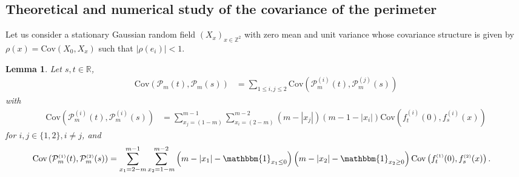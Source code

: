 \documentclass[12pt]{article}
\theoremstyle{Theorem}
\newtheorem{Lemma}[Theorem]{Lemma}
\theoremstyle{definition}
\begin{document}
\subsection{Theoretical and numerical study of the covariance of the perimeter}
Let us consider a stationary Gaussian random field $\left(X_{\scriptscriptstyle x}\right)_{x \in \mathbb{Z}^{2}}$ with zero mean and unit variance whose covariance structure is given by $\rho(x) = \text{Cov}\left(X_{\scriptscriptstyle 0}, X_{\scriptscriptstyle x}\right)$ such that $|\rho(e_i)| < 1$.
\begin{Lemma} 
Let $s, t \in \mathbb{R}$, 
\label{CovLemma}
\begin{align*}
\text{Cov}(\mathcal{P}_{m}(t), \mathcal{P}_{m}(s))  & = \sum_{1\leq i,j\leq 2}\text{Cov}(\mathcal{P}_{m}^{\scriptscriptstyle (i)}(t), \mathcal{P}_{m}^{\scriptscriptstyle (j)}(s)) 
\end{align*} 
with 
\begin{align*}
\text{Cov}\left(\mathcal{P}_{m}^{\scriptscriptstyle (i)}(t),\mathcal{P}_{m}^{\scriptscriptstyle (i)}(s) \right) 
& = \sum_{x_{\scriptscriptstyle j}=\left(1-m\right)}^{m-1}\sum_{x_{\scriptscriptstyle i}=\left(2-m\right)}^{m-2}\left(m -|x_{j}|\right)\left(m - 1- |x_{i}|\right) \text{Cov}\left(f_{t}^{\scriptscriptstyle (i)}(0), f_{s}^{\scriptscriptstyle (i)}(x) \right) 
\end{align*} 
for $i,j \in\{1,2\}, i\neq j$, and 
\begin{align*}
\text{Cov}\left(\mathcal{P}_{m}^{\scriptscriptstyle (1)}(t),\mathcal{P}_{m}^{\scriptscriptstyle (2)}(s) \right) 
& = \sum_{x_1=2-m}^{m-1} \sum_{x_2 = 1-m}^{m-2} \left(m-|x_1| - \mathbbm{1}_{x_{1} \leq 0}\right)\left(m-|x_2|-\mathbbm{1}_{x_{2} \geq 0}\right)\text{Cov}\left(f_{t}^{\scriptscriptstyle (1)}(0), f_{s}^{ \scriptscriptstyle (2)}(x) \right).
\end{align*}
\end{Lemma}
\end{document}
